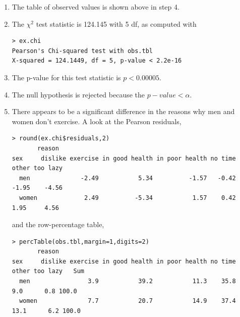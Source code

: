 \documentclass[10pt,openany]{book}\usepackage[]{graphicx}\usepackage[]{color}
\makeatletter
\newenvironment{kframe}{%
 \def\at@end@of@kframe{}%
 \ifinner\ifhmode%
  \def\at@end@of@kframe{\end{minipage}}%
  \begin{minipage}{\columnwidth}%
 \fi\fi%
 \def\FrameCommand##1{\hskip\@totalleftmargin \hskip-\fboxsep
 \colorbox{shadecolor}{##1}\hskip-\fboxsep
     \hskip-\linewidth \hskip-\@totalleftmargin \hskip\columnwidth}%
 \MakeFramed {\advance\hsize-\width
   \@totalleftmargin\z@ \linewidth\hsize
   \@setminipage}}%
 {\par\unskip\endMakeFramed%
 \at@end@of@kframe}
\newenvironment{knitrout}{}{} %
\makeatother
\begin{document}
\begin{itemize}
\begin{enumerate}
\begin{knitrout}
\begin{kframe}
\end{kframe}
\end{knitrout}
      \item The table of observed values is shown above in step 4.
      \item The $\chi^{2}$ test statistic is 124.145 with 5 df, as computed with
\begin{knitrout}
\color{fgcolor}\begin{kframe}
\begin{verbatim}
> ex.chi
Pearson's Chi-squared test with obs.tbl 
X-squared = 124.1449, df = 5, p-value < 2.2e-16
\end{verbatim}
\end{kframe}
\end{knitrout}
      \item The p-value for this test statistic is $p<0.00005$.
      \item The null hypothesis is rejected because the $p-value<\alpha$.
      \item There appears to be a significant difference in the reasons why men and women don't exercise.  A look at the Pearson residuals,
\begin{knitrout}
\color{fgcolor}\begin{kframe}
\begin{verbatim}
> round(ex.chi$residuals,2)
       reason
sex     dislike exercise in good health in poor health no time other too lazy
  men              -2.49           5.34          -1.57   -0.42 -1.95    -4.56
  women             2.49          -5.34           1.57    0.42  1.95     4.56
\end{verbatim}
\end{kframe}
\end{knitrout}
and the row-percentage table,
\begin{knitrout}
\color{fgcolor}\begin{kframe}
\begin{verbatim}
> percTable(obs.tbl,margin=1,digits=2)
       reason
sex     dislike exercise in good health in poor health no time other too lazy   Sum
  men                3.9           39.2           11.3    35.8   9.0      0.8 100.0
  women              7.7           20.7           14.9    37.4  13.1      6.2 100.0
\end{verbatim}
\end{kframe}
\end{knitrout}

\end{enumerate}
\end{itemize}
\end{document}
